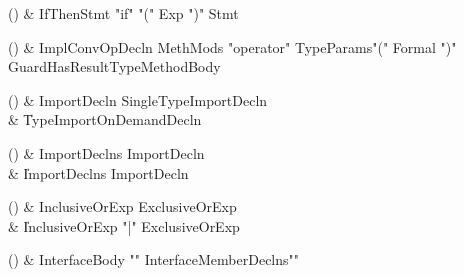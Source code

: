 \begin{bbgrammarappendix}{4.0in}

() & IfThenStmt \label{prod:IfThenStmt}  \: \xcd"if" \xcd"(" Exp \xcd")" Stmt  \\


\end{bbgrammarappendix}

\begin{bbgrammarappendix}{3.5in}

() & ImplConvOpDecln \label{prod:ImplConvOpDecln}  \: MethMods \xcd"operator" TypeParams\opt \xcd"(" Formal  \xcd")" Guard\opt HasResultType\opt MethodBody  \\


\end{bbgrammarappendix}

\begin{bbgrammarappendix}{3.9in}

() & ImportDecln \label{prod:ImportDecln}  \: SingleTypeImportDecln  \\

 &    \| TypeImportOnDemandDecln \\

\end{bbgrammarappendix}

\begin{bbgrammarappendix}{3.8in}

() & ImportDeclns \label{prod:ImportDeclns}  \: ImportDecln  \\

 &    \| ImportDeclns ImportDecln \\

\end{bbgrammarappendix}

\begin{bbgrammarappendix}{3.6in}

() & InclusiveOrExp \label{prod:InclusiveOrExp}  \: ExclusiveOrExp  \\

 &    \| InclusiveOrExp \xcd"|" ExclusiveOrExp \\

\end{bbgrammarappendix}

\begin{bbgrammarappendix}{3.7in}

() & InterfaceBody \label{prod:InterfaceBody}  \: \xcd"{" InterfaceMemberDeclns\opt \xcd"}"  \\


\end{bbgrammarappendix}

